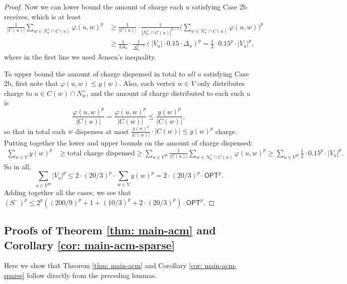 \begin{proof}
    Now we can lower bound the amount of charge each $u$ satisfying Case 2b receives, which is at least
    \begin{align*}
    \frac{1}{|C(u)|} \sum_{w \in N_u^+ \cap C(u)} \varphi(u,w)^p &\geq \frac{1}{|C(u)|} \cdot \frac{1}{|N_u^+ \cap C(u)|^{p-1}} \Big(\sum_{w \in N_u^+ \cap C(u)} \varphi(u,w) \Big)^p \\
    &\geq \frac{1}{2\Delta_u} \cdot \frac{1}{\Delta_u^{p-1}} \left(|V_u| \cdot 0.15\cdot \Delta_u \right)^p 
    = \frac{1}{2} \cdot 0.15^p \cdot |V_u|^p,
    \end{align*}
    where in the first line we used Jensen's inequality. 

    To upper bound the amount of charge dispensed in total to \textit{all} $u$ satisfying Case 2b, first note that $\varphi(u,w) \leq y(w)$. Also, each vertex $w \in V$ only distributes charge to $u \in C(w) \cap N_w^+$, and the amount of charge distributed to each such $u$ is 
    $$\frac{\varphi(u,w)^p}{|C(u)|} = \frac{\varphi(u,w)^p}{|C(w)|} \leq \frac{y(w)^p}{|C(w)|},$$
    so that in total each $w$ dispenses at most 
    $\frac{y(w)^p}{|C(w)|} \cdot |C(w)| \leq y(w)^p$ 
 charge. Putting together the lower and upper bounds on the amount of charge dispensed:
 \begin{align*}
     \sum_{w \in V} y(w)^p &\geq \text{total charge dispensed} 
     \geq \sum_{u \in V^{2b}} \frac{1}{|C(u)|} \sum_{w \in N_u^+ \cap C(u)} \varphi(u,w)^p 
     \geq \sum_{u \in V^{2b}} \frac{1}{2} \cdot 0.15^p \cdot |V_u|^p.
 \end{align*}
 So in all,
 \[\boxed{\sum_{u \in V^{2b}} |V_u|^p \leq 2 \cdot (20/3)^p \cdot \sum_{w \in V} y(w)^p = 2 \cdot (20/3)^p \cdot \textsf{OPT}^p.}\]
Adding together all the cases, we see that
$ (S^-)^p\leq 
2^p ((200/9)^p+1+(10/3)^p+2\cdot (20/3)^p)\cdot \textsf{OPT}^p.
$
 \end{proof}

 \subsection{Proofs of Theorem \ref{thm: main-acm} and Corollary {\ref{cor: main-acm-sparse}}} \label{sec: thm1_proof}

Here we show that Theorem \ref{thm: main-acm} and Corollary \ref{cor: main-acm-sparse} follow directly from the preceding lemmas. 




